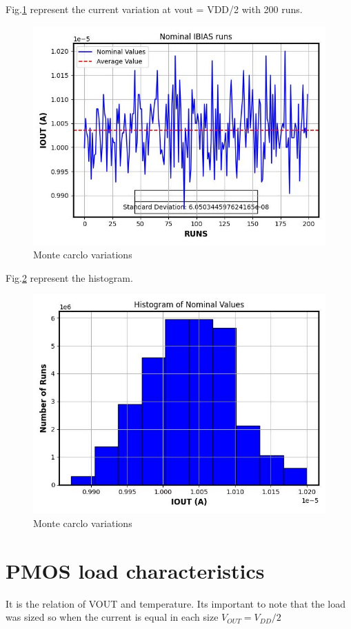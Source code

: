 \documentclass{article}
\begin{document}
Fig.\ref{fig:nominal} represent the current variation at vout = VDD/2 with 200 runs.

\begin{figure}[H] %
    \centering
    \includegraphics[width=.6\textwidth]{./Nominal_IBIAS_runs.jpg} %
    \caption{Monte carclo variations}\label{fig:nominal}
\end{figure}


Fig.\ref{fig:histogram} represent the histogram.

\begin{figure}[H] %
    \centering
    \includegraphics[width=.6\textwidth]{./Nominal_IBIAS_runs_histogram.jpg} %
    \caption{Monte carclo variations}\label{fig:histogram}
\end{figure}


\section{PMOS load characteristics}

It is the relation of VOUT and temperature. Its important to note that the load was sized so when the current is equal in each size $V_{OUT} = V_{DD}/2$
\newline
\end{document}
